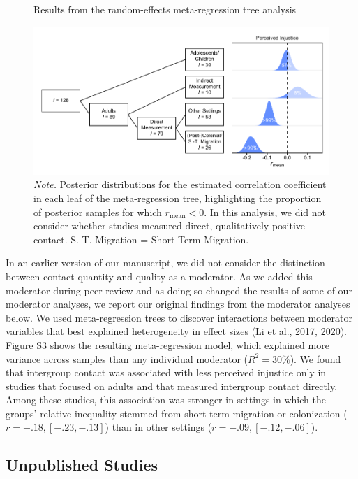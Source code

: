 \documentclass[12pt, letterpaper]{article}
\begin{document}
\begin{figure}
\centering
\caption{Results from the random-effects meta-regression tree analysis}
\includegraphics[scale=1]{../figures/figure-s3}
\caption*{\textit{Note.} Posterior distributions for the estimated correlation coefficient in each leaf of the meta-regression tree, highlighting the proportion of posterior samples for which $r_\text{mean} < 0$. In this analysis, we did not consider whether studies measured direct, qualitatively positive contact. S.-T. Migration = Short-Term Migration.}
\label{fig:s3}
\end{figure}

In an earlier version of our manuscript, we did not consider the
distinction between contact quantity and quality as a moderator. As we
added this moderator during peer review and as doing so changed the
results of some of our moderator analyses, we report our original
findings from the moderator analyses below. We used meta-regression
trees to discover interactions between moderator variables that best
explained heterogeneity in effect sizes (Li et al., 2017, 2020). Figure
S3 shows the resulting meta-regression model, which explained more
variance across samples than any individual moderator (\(R^2 = 30\%\)).
We found that intergroup contact was associated with less perceived
injustice only in studies that focused on adults and that measured
intergroup contact directly. Among these studies, this association was
stronger in settings in which the groups' relative inequality stemmed
from short-term migration or colonization (\(r = -.18, [-.23, -.13]\))
than in other settings (\(r = -.09, [-.12, -.06]\)).

\hypertarget{unpublished-studies}{%
\subsection{Unpublished Studies}\label{unpublished-studies}}
\end{document}
